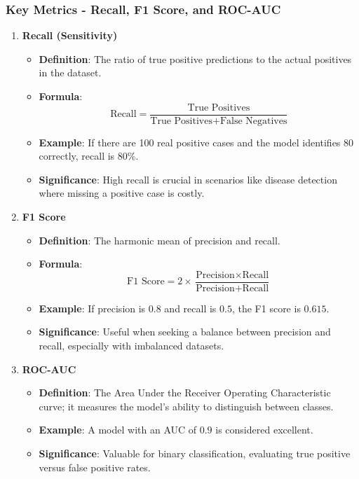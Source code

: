 \documentclass[aspectratio=169]{beamer}
\begin{document}
\begin{frame}[fragile]
    \frametitle{Key Metrics - Recall, F1 Score, and ROC-AUC}
    \begin{enumerate}
        \item \textbf{Recall (Sensitivity)}
        \begin{itemize}
            \item \textbf{Definition}: The ratio of true positive predictions to the actual positives in the dataset.
            \item \textbf{Formula}:
            \[
            \text{Recall} = \frac{\text{True Positives}}{\text{True Positives} + \text{False Negatives}}
            \]
            \item \textbf{Example}: If there are 100 real positive cases and the model identifies 80 correctly, recall is \(80\%\).
            \item \textbf{Significance}: High recall is crucial in scenarios like disease detection where missing a positive case is costly.
        \end{itemize}
        
        \item \textbf{F1 Score}
        \begin{itemize}
            \item \textbf{Definition}: The harmonic mean of precision and recall.
            \item \textbf{Formula}:
            \[
            \text{F1 Score} = 2 \times \frac{\text{Precision} \times \text{Recall}}{\text{Precision} + \text{Recall}}
            \]
            \item \textbf{Example}: If precision is \(0.8\) and recall is \(0.5\), the F1 score is \(0.615\).
            \item \textbf{Significance}: Useful when seeking a balance between precision and recall, especially with imbalanced datasets.
        \end{itemize}
        
        \item \textbf{ROC-AUC}
        \begin{itemize}
            \item \textbf{Definition}: The Area Under the Receiver Operating Characteristic curve; it measures the model's ability to distinguish between classes.
            \item \textbf{Example}: A model with an AUC of \(0.9\) is considered excellent.
            \item \textbf{Significance}: Valuable for binary classification, evaluating true positive versus false positive rates.
        \end{itemize}
    \end{enumerate}
\end{frame}
\end{document}
